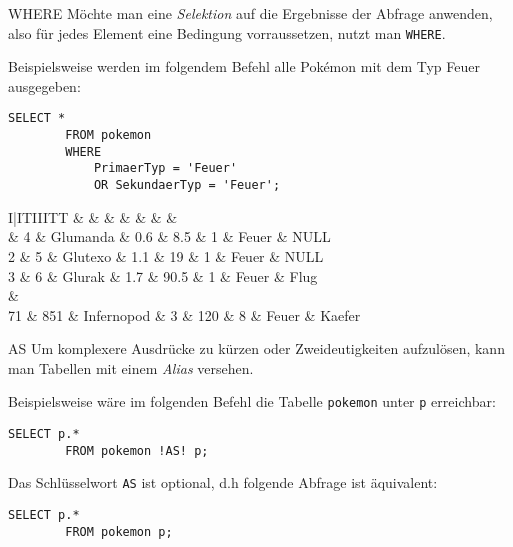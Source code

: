 \begin{sql}{WHERE}
    Möchte man eine \emph{Selektion} auf die Ergebnisse der Abfrage anwenden, also für jedes Element eine Bedingung vorraussetzen, nutzt man \texttt{WHERE}.

    Beispielsweise werden im folgendem Befehl alle Pokémon mit dem Typ Feuer ausgegeben:

    \begin{lstlisting}[style=SqlInputStyle]
        SELECT *
        FROM pokemon
        WHERE
            PrimaerTyp = 'Feuer'
            OR SekundaerTyp = 'Feuer';
    \end{lstlisting}

    \begin{tabular}{I|ITIIITT}
        &  &  &  &  &  &  &  \\ & 4 & Glumanda & 0.6 & 8.5 & 1 & Feuer & NULL \\
        2 & 5 & Glutexo & 1.1 & 19 & 1 & Feuer & NULL \\
        3 & 6 & Glurak & 1.7 & 90.5 & 1 & Feuer & Flug \\
         &  \\
        71 & 851 & Infernopod & 3 & 120 & 8 & Feuer & Kaefer \\
    \end{tabular}
\end{sql}

\begin{sql}{AS}
    Um komplexere Ausdrücke zu kürzen oder Zweideutigkeiten aufzulösen, kann man Tabellen mit einem \emph{Alias} versehen.

    Beispielsweise wäre im folgenden Befehl die Tabelle \texttt{pokemon} unter \texttt{p} erreichbar:

    \begin{lstlisting}[style=SqlInputStyle]
        SELECT p.*
        FROM pokemon !AS! p;
    \end{lstlisting}

    Das Schlüsselwort \texttt{AS} ist optional, d.h folgende Abfrage ist äquivalent:
    
    \begin{lstlisting}[style=SqlInputStyle]
        SELECT p.*
        FROM pokemon p;
    \end{lstlisting}
\end{sql}

